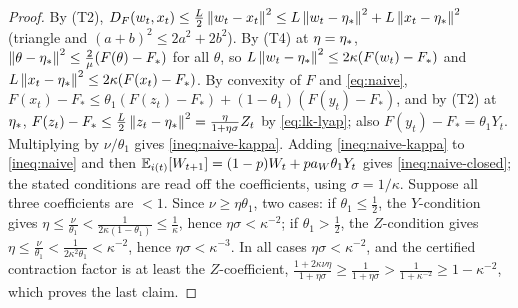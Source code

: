 \begin{proof}
By (T2), $D_F(w_t,x_t)\le\frac L2\left\|w_t-x_t\right\|^2\le L\left\|w_t-\eta_\ast\right\|^2+L\left\|x_t-\eta_\ast\right\|^2$ (triangle and $(a+b)^2\le2a^2+2b^2$). By (T4) at $\eta=\eta_\ast$, $\left\|\theta-\eta_\ast\right\|^2\le\frac2\mu(F(\theta)-F_\ast)$ for all $\theta$, so $L\left\|w_t-\eta_\ast\right\|^2\le2\kappa(F(w_t)-F_\ast)$ and $L\left\|x_t-\eta_\ast\right\|^2\le2\kappa(F(x_t)-F_\ast)$. By convexity of $F$ and \eqref{eq:naive}, $F(x_t)-F_\ast\le\theta_1(F(z_t)-F_\ast)+(1-\theta_1)(F(y_t)-F_\ast)$, and by (T2) at $\eta_\ast$, $F(z_t)-F_\ast\le\frac L2\left\|z_t-\eta_\ast\right\|^2=\frac{\eta}{1+\eta\sigma}Z_t$ by \eqref{eq:lk-lyap}; also $F(y_t)-F_\ast=\theta_1Y_t$. Multiplying by $\nu/\theta_1$ gives \eqref{ineq:naive-kappa}. Adding \eqref{ineq:naive-kappa} to \eqref{ineq:naive} and then $\mathbb{E}_{i(t)}[W_{t+1}]=(1-p)W_t+pa_W\theta_1Y_t$ gives \eqref{ineq:naive-closed}; the stated conditions are read off the coefficients, using $\sigma=1/\kappa$. Suppose all three coefficients are $<1$. Since $\nu\ge\eta\theta_1$, two cases: if $\theta_1\le\frac12$, the $Y$-condition gives $\eta\le\frac\nu{\theta_1}<\frac1{2\kappa(1-\theta_1)}\le\frac1\kappa$, hence $\eta\sigma<\kappa^{-2}$; if $\theta_1>\frac12$, the $Z$-condition gives $\eta\le\frac\nu{\theta_1}<\frac1{2\kappa^2\theta_1}<\kappa^{-2}$, hence $\eta\sigma<\kappa^{-3}$. In all cases $\eta\sigma<\kappa^{-2}$, and the certified contraction factor is at least the $Z$-coefficient, $\frac{1+2\kappa\nu\eta}{1+\eta\sigma}\ge\frac1{1+\eta\sigma}>\frac1{1+\kappa^{-2}}\ge1-\kappa^{-2}$, which proves the last claim.
\end{proof}

